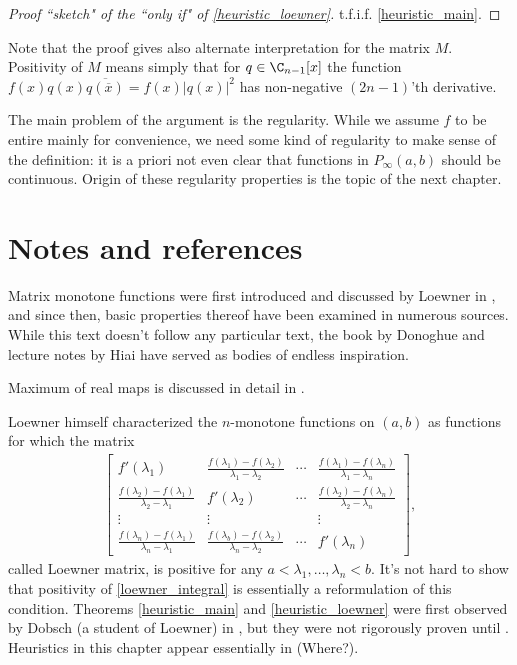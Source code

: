 \begin{proof}[Proof ``sketch" of the ``only if" of \ref{heuristic_loewner}]
	t.f.i.f. \ref{heuristic_main}.
\end{proof}

Note that the proof gives also alternate interpretation for the matrix $M$. Positivity of $M$ means simply that for $q \in \C_{n - 1}[x]$ the function $f(x) q(x) \overline{q(\overline{x})} = f(x) |q(x)|^2$ has non-negative $(2 n - 1)$'th derivative.

The main problem of the argument is the regularity. While we assume $f$ to be entire mainly for convenience, we need some kind of regularity to make sense of the definition: it is a priori not even clear that functions in $P_{\infty}(a, b)$ should be continuous. Origin of these regularity properties is the topic of the next chapter.

\section{Notes and references}

Matrix monotone functions were first introduced and discussed by Loewner in \cite{Low}, and since then, basic properties thereof have been examined in numerous sources. While this text doesn't follow any particular text, the book by Donoghue \cite{Don} and lecture notes by Hiai \cite{Hiai} have served as bodies of endless inspiration.

Maximum of real maps is discussed in detail in \cite{Ando2}.

Loewner himself characterized the $n$-monotone functions on $(a, b)$ as functions for which the matrix
\begin{align*}
	\begin{bmatrix}
		f'(\lambda_{1}) & \frac{f(\lambda_{1}) - f(\lambda_{2})}{\lambda_{1} - \lambda_{2}} & \cdots & \frac{f(\lambda_{1}) - f(\lambda_{n})}{\lambda_{1} - \lambda_{n}} \\
		\frac{f(\lambda_{2}) - f(\lambda_{1})}{\lambda_{2} - \lambda_{1}} & f'(\lambda_{2}) & \cdots & \frac{f(\lambda_{2}) - f(\lambda_{n})}{\lambda_{2} - \lambda_{n}} \\
		\vdots & \vdots & & \vdots \\
		\frac{f(\lambda_{n}) - f(\lambda_{1})}{\lambda_{n} - \lambda_{1}} & \frac{f(\lambda_{b}) - f(\lambda_{2})}{\lambda_{n} - \lambda_{2}} & \cdots & f'(\lambda_{n}) 
	\end{bmatrix},
\end{align*}
called Loewner matrix, is positive for any $a < \lambda_{1}, \ldots, \lambda_{n} < b$. It's not hard to show that positivity of \ref{loewner_integral} is essentially a reformulation of this condition. Theorems \ref{heuristic_main} and \ref{heuristic_loewner} were first observed by Dobsch (a student of Loewner) in \cite{Dob}, but they were not rigorously proven until \cite{Don}. Heuristics in this chapter appear essentially in (Where?).



